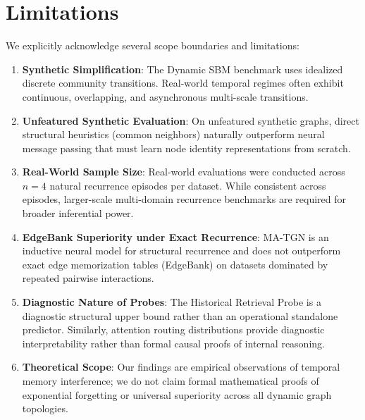 \section{Limitations}
\label{sec:limitations}

We explicitly acknowledge several scope boundaries and limitations:
\begin{enumerate}
    \item \textbf{Synthetic Simplification}: The Dynamic SBM benchmark uses idealized discrete community transitions. Real-world temporal regimes often exhibit continuous, overlapping, and asynchronous multi-scale transitions.
    \item \textbf{Unfeatured Synthetic Evaluation}: On unfeatured synthetic graphs, direct structural heuristics (common neighbors) naturally outperform neural message passing that must learn node identity representations from scratch.
    \item \textbf{Real-World Sample Size}: Real-world evaluations were conducted across $n=4$ natural recurrence episodes per dataset. While consistent across episodes, larger-scale multi-domain recurrence benchmarks are required for broader inferential power.
    \item \textbf{EdgeBank Superiority under Exact Recurrence}: MA-TGN is an inductive neural model for structural recurrence and does not outperform exact edge memorization tables (EdgeBank) on datasets dominated by repeated pairwise interactions.
    \item \textbf{Diagnostic Nature of Probes}: The Historical Retrieval Probe is a diagnostic structural upper bound rather than an operational standalone predictor. Similarly, attention routing distributions provide diagnostic interpretability rather than formal causal proofs of internal reasoning.
    \item \textbf{Theoretical Scope}: Our findings are empirical observations of temporal memory interference; we do not claim formal mathematical proofs of exponential forgetting or universal superiority across all dynamic graph topologies.
\end{enumerate}
